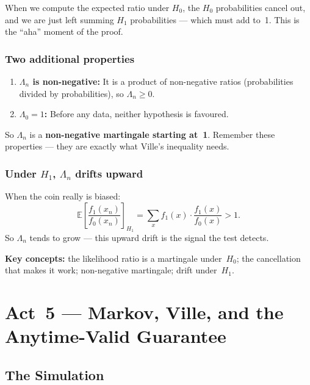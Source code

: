 \documentclass[12pt, a4paper]{article}
\newcommand{\E}{\mathbb{E}}            %
\newcommand{\LR}{\Lambda}              %
\begin{document}
\begin{plainlanguage}
When we compute the expected ratio under $H_0$, the $H_0$ probabilities
cancel out, and we are just left summing $H_1$ probabilities --- which must
add to~1.  This is the ``aha'' moment of the proof.
\end{plainlanguage}

\subsubsection*{Two additional properties}

\begin{enumerate}[nosep]
  \item \textbf{$\LR_n$ is non-negative:} It is a product of non-negative
        ratios (probabilities divided by probabilities), so $\LR_n \geq 0$.
  \item \textbf{$\LR_0 = 1$:} Before any data, neither hypothesis is favoured.
\end{enumerate}

So $\LR_n$ is a \textbf{non-negative martingale starting at~1}.  Remember
these properties --- they are exactly what Ville's inequality needs.

\subsubsection*{Under $H_1$, $\LR_n$ drifts upward}

When the coin really is biased:
\[
  \E\!\left[\frac{f_1(x_n)}{f_0(x_n)}\right]_{\!H_1}
  = \sum_x f_1(x) \cdot \frac{f_1(x)}{f_0(x)}
  > 1.
\]
So $\LR_n$ tends to grow --- this upward drift is the signal the test detects.

\begin{keytakeaway}
\textbf{Key concepts:} the likelihood ratio is a martingale under~$H_0$;
the cancellation that makes it work; non-negative martingale; drift under~$H_1$.
\end{keytakeaway}


\newpage
\section{Act~5 --- Markov, Ville, and the Anytime-Valid Guarantee}

\subsection{The Simulation}
\end{document}
